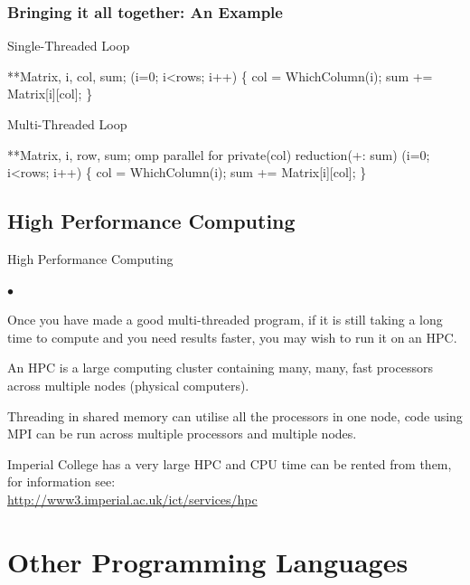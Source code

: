 \documentclass[smaller,handout,table]{beamer}
\begin{document}
\begin{frame}[fragile]
\frametitle{Bringing it all together: An Example}
\begin{small}
\begin{block}{Single-Threaded Loop}
\begin{semiverbatim}
\kl{} **Matrix, i, col, sum;
\kl{} (i=0; i<rows; i++)
\kl\{
\kl     col = WhichColumn(i);
\kl     sum += Matrix[i][col];
\kl\}
\end{semiverbatim}
\end{block}
\begin{block}{Multi-Threaded Loop}
\begin{semiverbatim}
\kl{} **Matrix, i, row, sum;
\kl{} omp parallel for private(col) reduction(+: sum)
\kl{} (i=0; i<rows; i++)
\kl\{
\kl     col = WhichColumn(i);
\kl     sum += Matrix[i][col];
\kl\}
\end{semiverbatim}
\end{block}
\end{small}
\end{frame}

\subsection{High Performance Computing}
\begin{frame}{High Performance Computing}
\begin{block}{}
\begin{list}{$\bullet$}{}
\item Once you have made a good multi-threaded program, if it is still taking a long time to compute and you need results faster, you may wish to run it on an HPC.
\item An HPC is a large computing cluster containing many, many, fast processors across multiple nodes (physical computers).
\item Threading in shared memory can utilise all the processors in one node, code using MPI can be run across multiple processors and multiple nodes.
\item Imperial College has a very large HPC and CPU time can be rented from them, for information see:\\
\url{http://www3.imperial.ac.uk/ict/services/hpc}
\end{list}
\end{block}
\end{frame}

\section{Other Programming Languages}
\end{document}
